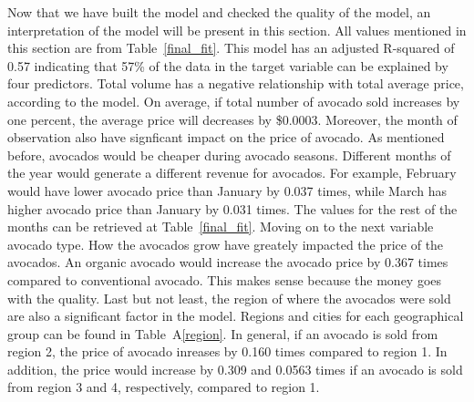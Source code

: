 \documentclass[11pt]{article}\usepackage[]{graphicx}\usepackage[]{color}
\begin{document}
\noindent Now that we have built the model and checked the quality of the model, an interpretation of the model will be present in this section. All values mentioned in this section are from Table~\ref{final_fit}. This model has an adjusted R-squared of 0.57 indicating that 57\% of the data in the target variable can be explained by four predictors. Total volume has a negative relationship with total average price, according to the model. On average, if total number of avocado sold increases by one percent, the average price will decreases by \$0.0003. Moreover, the month of observation also have signficant impact on the price of avocado. As mentioned before, avocados would be cheaper during avocado seasons. Different months of the year would generate a different revenue for avocados. For example, February would have lower avocado price than January by 0.037 times, while March has higher avocado price than January by 0.031 times. The values for the rest of the months can be retrieved at Table~\ref{final_fit}. Moving on to the next variable avocado type. How the avocados grow have greately impacted the price of the avocados. An organic avocado would increase the avocado price by 0.367 times compared to conventional avocado. This makes sense because the money goes with the quality. Last but not least, the region of where the avocados were sold are also a significant factor in the model. Regions and cities for each geographical group can be found in Table~A\ref{region}. In general, if an avocado is sold from region 2, the price of avocado inreases by 0.160 times compared to region 1. In addition, the price would increase by 0.309 and 0.0563 times if an avocado is sold from region 3 and 4, respectively, compared to region 1.
\hfill \break
\end{document}
